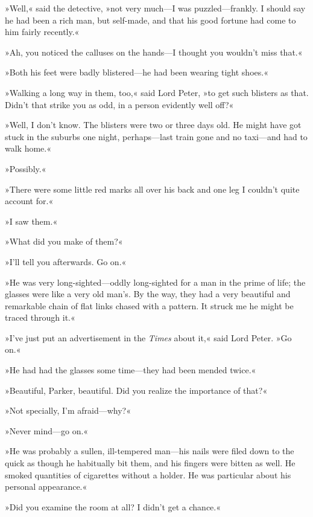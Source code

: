 »Well,« said the detective, »not very much\allowbreak---\allowbreak I was puzzled\allowbreak---\allowbreak frankly. I should say he had been a rich man, but self-made, and that his good fortune had come to him fairly recently.«

»Ah, you noticed the calluses on the hands\allowbreak---\allowbreak I thought you wouldn't miss that.«

»Both his feet were badly blistered\allowbreak---\allowbreak he had been wearing tight shoes.«

»Walking a long way in them, too,« said Lord Peter, »to get such blisters as that. Didn't that strike you as odd, in a person evidently well off?«

»Well, I don't know. The blisters were two or three days old. He might have got stuck in the suburbs one night, perhaps\allowbreak---\allowbreak last train gone and no taxi\allowbreak---\allowbreak and had to walk home.«

»Possibly.«

»There were some little red marks all over his back and one leg I couldn't quite account for.«

»I saw them.«

»What did you make of them?«

»I'll tell you afterwards. Go on.«

»He was very long-sighted\allowbreak---\allowbreak oddly long-sighted for a man in the prime of life; the glasses were like a very old man's. By the way, they had a very beautiful and remarkable chain of flat links chased with a pattern. It struck me he might be traced through it.«

»I've just put an advertisement in the \textit{Times} about it,« said Lord Peter. »Go on.«

»He had had the glasses some time\allowbreak---\allowbreak they had been mended twice.«

»Beautiful, Parker, beautiful. Did you realize the importance of that?«

»Not specially, I'm afraid\allowbreak---\allowbreak why?«

»Never mind\allowbreak---\allowbreak go on.«

»He was probably a sullen, ill-tempered man\allowbreak---\allowbreak his nails were filed down to the quick as though he habitually bit them, and his fingers were bitten as well. He smoked quantities of cigarettes without a holder. He was particular about his personal appearance.«

»Did you examine the room at all? I didn't get a chance.«

